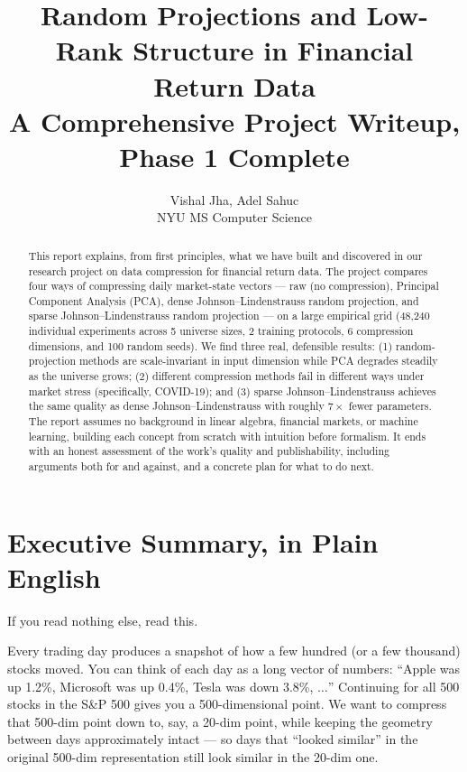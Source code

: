 \documentclass[11pt]{article}
\title{\textbf{Random Projections and Low-Rank Structure in Financial Return Data}\\[6pt]\large{A Comprehensive Project Writeup, Phase 1 Complete}}
\author{Vishal Jha, Adel Sahuc \\ NYU MS Computer Science}
\date{}
\begin{document}
\maketitle

\begin{abstract}
\noindent
This report explains, from first principles, what we have built and discovered in our research project on data compression for financial return data. The project compares four ways of compressing daily market-state vectors --- raw (no compression), Principal Component Analysis (PCA), dense Johnson--Lindenstrauss random projection, and sparse Johnson--Lindenstrauss random projection --- on a large empirical grid (48{,}240 individual experiments across 5 universe sizes, 2 training protocols, 6 compression dimensions, and 100 random seeds). We find three real, defensible results: (1) random-projection methods are scale-invariant in input dimension while PCA degrades steadily as the universe grows; (2) different compression methods fail in different ways under market stress (specifically, COVID-19); and (3) sparse Johnson--Lindenstrauss achieves the same quality as dense Johnson--Lindenstrauss with roughly $7\times$ fewer parameters. The report assumes no background in linear algebra, financial markets, or machine learning, building each concept from scratch with intuition before formalism. It ends with an honest assessment of the work's quality and publishability, including arguments both for and against, and a concrete plan for what to do next.
\end{abstract}

\tableofcontents
\newpage

\section{Executive Summary, in Plain English}

If you read nothing else, read this.

Every trading day produces a snapshot of how a few hundred (or a few thousand) stocks moved. You can think of each day as a long vector of numbers: ``Apple was up 1.2\%, Microsoft was up 0.4\%, Tesla was down 3.8\%, $\ldots$'' Continuing for all 500 stocks in the S\&P 500 gives you a 500-dimensional point. We want to compress that 500-dim point down to, say, a 20-dim point, while keeping the geometry between days approximately intact --- so days that ``looked similar'' in the original 500-dim representation still look similar in the 20-dim one.
\end{document}
